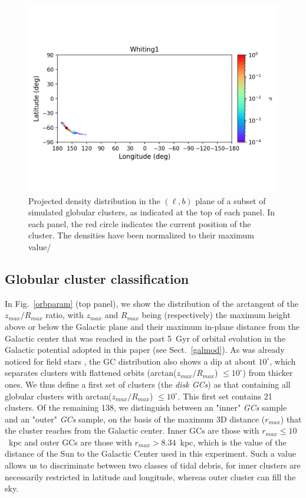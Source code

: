 \begin{figure}
\begin{center}
                \includegraphics[clip=true, trim = 0mm 20mm 0mm 10mm, width=1\columnwidth]{images/error_plots_Whiting1.png}
            \end{center}
            \caption[]{Projected density distribution in the $(\ell, b)$ plane of a subset of simulated globular clusters, as indicated at the top of each panel. In each panel, the red circle indicates the current position of the cluster. The densities have been normalized to their maximum value/}\label{stream20}
        \end{figure}
    
        \onecolumn
    \subsection{Globular cluster classification}\label{class}
        In Fig.~\ref{orbparam} (top panel), we show the distribution of the arctangent of the $z_{max}/R_{max}$ ratio, with $z_{max}$ and $R_{max}$ being (respectively) the maximum height above or below the Galactic plane and their maximum in-plane distance from the Galactic center that was reached in the past 5~Gyr of orbital evolution in the Galactic potential adopted in this paper (see Sect.~\ref{galmod}). As was already noticed for field stars \citep[see][]{2018ApJ...863..113H}, the GC distribution also shows a dip at about $10^\circ$, which separates clusters with flattened orbits (arctan($z_{max}/R_{max}$) $\le 10^\circ$) from thicker ones. We thus define a first set of clusters (the \emph{disk GCs}) as that containing all globular clusters with arctan($z_{max}/R_{max}$) $\le 10^\circ$. This first set contains 21 clusters. Of the remaining 138, we distinguish between  an "inner" \emph{ GCs} sample and an "outer" \emph{ GCs} sample, on the basis of the maximum 3D distance ($r_{max}$) that the cluster reaches from the Galactic center. Inner GCs are those with $r_{max} \le 10$~kpc and outer GCs are those with $r_{max} > 8.34$~kpc, which is the value of the distance of the Sun to the Galactic Center used in this experiment. Such a value allows us to discriminate between two classes of tidal debris, for inner clusters are necessarily restricted in latitude and longitude, whereas outer cluster can fill the sky. 


